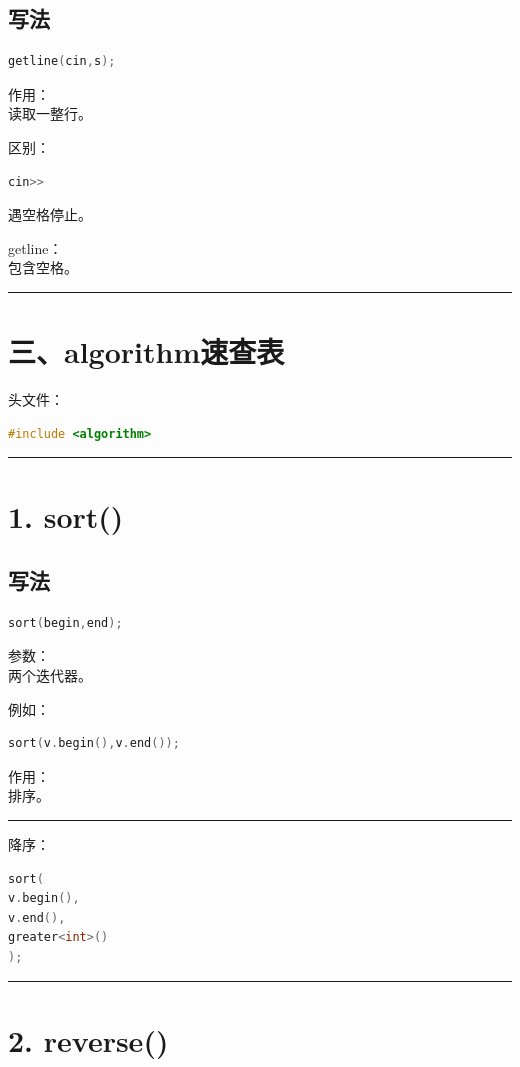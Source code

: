 \documentclass[10pt,twocolumn]{extarticle}
\begin{document}
\subsection{写法}
\begin{lstlisting}[language=C++]
getline(cin,s);
\end{lstlisting}
作用：\\
读取一整行。

区别：
\begin{lstlisting}[language=C++]
cin>>
\end{lstlisting}
遇空格停止。

getline：\\
包含空格。

\noindent\rule{\linewidth}{0.4pt}

\section{三、algorithm速查表}

头文件：
\begin{lstlisting}[language=C++]
#include <algorithm>
\end{lstlisting}

\noindent\rule{\linewidth}{0.4pt}

\section{1. sort()}

\subsection{写法}
\begin{lstlisting}[language=C++]
sort(begin,end);
\end{lstlisting}
参数：\\
两个迭代器。

例如：
\begin{lstlisting}[language=C++]
sort(v.begin(),v.end());
\end{lstlisting}
作用：\\
排序。

\noindent\rule{\linewidth}{0.4pt}

降序：
\begin{lstlisting}[language=C++]
sort(
v.begin(),
v.end(),
greater<int>()
);
\end{lstlisting}

\noindent\rule{\linewidth}{0.4pt}

\section{2. reverse()}
\end{document}
